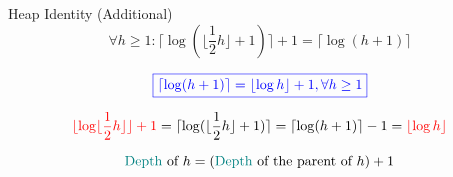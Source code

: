 
\begin{frame}{}
  \begin{exampleblock}{Heap Identity (Additional)}
    \[
      \forall h \ge 1: \lceil \log(\lfloor \frac{1}{2}h \rfloor + 1)\rceil + 1 = \lceil \log (h+1) \rceil
    \]
  \end{exampleblock}

  \pause
  \[
    \textcolor{blue}{\boxed{\lceil \log (h + 1) \rceil = \lfloor \log h \rfloor + 1, \forall h \ge 1}}
  \]

  \pause
  \[
    \textcolor{red}{\lfloor \log \lfloor \frac{1}{2} h \rfloor \rfloor + 1}
    = \lceil \log(\lfloor \frac{1}{2}h \rfloor + 1)\rceil 
    = \lceil \log (h+1) \rceil - 1
    = \textcolor{red}{\lfloor \log h \rfloor}
  \]

  \pause
  \[
    \textcolor{teal}{\text{Depth }} \text{of } h = (\textcolor{teal}{\text{Depth }} \text{of the parent of } h) + 1 
  \]
\end{frame}


